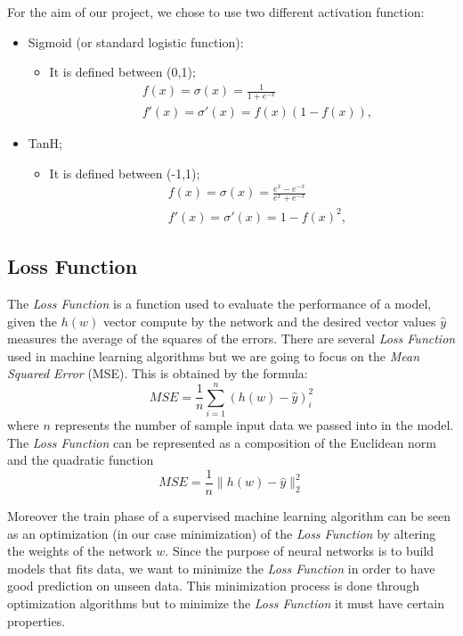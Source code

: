For the aim of our project, we chose to use two different activation function:
\begin{itemize}
	\label{sigmoid}
	\item Sigmoid (or standard logistic function):
	\begin{itemize}
		\item It is defined between (0,1); 		
			\begin{align*}
			&f(x) = \sigma(x) = \frac{1}{1 + e^{-x}} \\
			&f'(x) = \sigma'(x) = f(x)(1 - f(x)),
			\end{align*} 
	\end{itemize}
	\item TanH;
	\label{tanH}
	\begin{itemize}
		\item It is defined between (-1,1); 		
		\begin{align*}
		&f(x) = \sigma(x) = \frac{e^{x}-e^{-x}}{e^{x} + e^{-x}} \\
		&f'(x) = \sigma'(x) = 1 - f(x)^{2},
		\end{align*} 
	\end{itemize}
\end{itemize}
\subsection{Loss Function}
The \textit{Loss Function} is a function used to evaluate the performance of a model, given the $h(w)$ vector compute by the network and the desired vector values $\widehat{y}$ measures the average of the squares of the errors. There are several \textit{Loss Function} used in machine learning algorithms but we are going to focus on the \textit{Mean Squared Error} (MSE). This is obtained by the formula: 	
\begin{equation}
MSE = \frac{1}{n} \sum_{i=1}^n (h(w) - \widehat{y})_{i}^2
\end{equation}
where $n$ represents the number of sample input data we passed into in the model. 
The \textit{Loss Function} can be represented as a composition of the Euclidean norm and the quadratic function
\begin{equation}
MSE = \frac{1}{n} \parallel h(w) - \widehat{y} \parallel_{2}^2  
\end{equation}

Moreover the train phase of a supervised machine learning algorithm can be seen as an optimization (in our case minimization) of the \textit{Loss Function} by altering the weights of the network $w$.   
Since the purpose of neural networks is to build models that fits data, we want to minimize the \textit{Loss Function} in order to have good prediction on unseen data. This minimization process is done through optimization algorithms but to minimize the \textit{Loss Function} it must have certain properties.	

